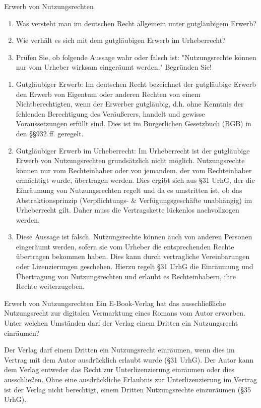 \documentclass{article}
\begin{document}
\begin{exercise}{Erwerb von Nutzungsrechten}
  \begin{enumerate}
    \item Was versteht man im deutschen Recht allgemein unter gutgläubigem Erwerb?
    \item Wie verhält es sich mit dem gutgläubigen Erwerb im Urheberrecht?
    \item Prüfen Sie, ob folgende Aussage wahr oder falsch ist: "Nutzungsrechte können nur vom Urheber wirksam eingeräumt werden." Begründen Sie!
  \end{enumerate}

  \begin{solution}
    \begin{enumerate}
      \item Gutgläubiger Erwerb: Im deutschen Recht bezeichnet der gutgläubige Erwerb den Erwerb von Eigentum oder anderen Rechten von einem Nichtberechtigten, wenn der Erwerber gutgläubig, d.h. ohne Kenntnis der fehlenden Berechtigung des Veräußerers, handelt und gewisse Voraussetzungen erfüllt sind. Dies ist im Bürgerlichen Gesetzbuch (BGB) in den §§932 ff. geregelt.
      \item Gutgläubiger Erwerb im Urheberrecht: Im Urheberrecht ist der gutgläubige Erwerb von Nutzungsrechten grundsätzlich nicht möglich. Nutzungsrechte können nur vom Rechteinhaber oder von jemandem, der vom Rechteinhaber ermächtigt wurde, übertragen werden. Dies ergibt sich aus §31 UrhG, der die Einräumung von Nutzungsrechten regelt und da es umstritten ist, ob das Abstraktionsprinzip (Verpflichtungs- \& Verfügungsgeschäfte unabhängig) im Urheberrecht gilt. Daher muss die Vertragskette lückenlos nachvollzogen werden.
      \item Diese Aussage ist falsch. Nutzungsrechte können auch von anderen Personen eingeräumt werden, sofern sie vom Urheber die entsprechenden Rechte übertragen bekommen haben. Dies kann durch vertragliche Vereinbarungen oder Lizenzierungen geschehen. Hierzu regelt §31 UrhG die Einräumung und Übertragung von Nutzungsrechten und erlaubt es Rechteinhabern, ihre Rechte weiterzugeben.
    \end{enumerate}
  \end{solution}
\end{exercise}


\begin{exercise}{Erwerb von Nutzungsrechten}
  Ein E-Book-Verlag hat das ausschließliche Nutzungsrecht zur digitalen Vermarktung eines Romans vom Autor erworben. Unter welchen Umständen darf der Verlag einem Dritten ein Nutzungsrecht einräumen?

  \begin{solution}
    Der Verlag darf einem Dritten ein Nutzungsrecht einräumen, wenn dies im Vertrag mit dem Autor ausdrücklich erlaubt wurde (§31 UrhG). Der Autor kann dem Verlag entweder das Recht zur Unterlizenzierung einräumen oder dies ausschließen. Ohne eine ausdrückliche Erlaubnis zur Unterlizenzierung im Vertrag ist der Verlag nicht berechtigt, einem Dritten Nutzungsrechte einzuräumen (§35 UrhG).
  \end{solution}
\end{exercise}
\end{document}
